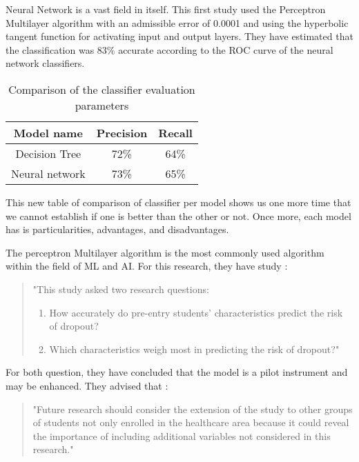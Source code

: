 \documentclass[conference]{IEEEtran}
\begin{document}
Neural Network is a vast field in itself. This first study used the Perceptron Multilayer algorithm with an admissible error of 0.0001 and using the hyperbolic tangent function for activating input and output layers\cite{viloria_integration_2019}. They have estimated that the classification was 83\% accurate according to the ROC curve of the neural network classifiers.
\begin{table}[H]
    \centering
    \caption{Comparison of the classifier evaluation parameters\cite{viloria_integration_2019}}
    \begin{tabular}{|c|c|c|}
        \hline
        \textbf{Model name} & \textbf{Precision}  & \textbf{Recall}\\
        \hline
        Decision Tree & 72\% & 64\% \\
        \hline
        Neural network & 73\% & 65\% \\
        \hline
    \end{tabular}
    \label{tab:comparaison_classifier_eval_param_viloria}
\end{table}

This new table of comparison of classifier per model shows us one more time that we cannot establish if one is better than the other or not. Once more, each model has is particularities, advantages, and disadvantages. 

The perceptron Multilayer algorithm is the most commonly used algorithm within the field of ML and AI.\cite{siri_predicting_2015} For this research, they have study :
\begin{quote}
    "This study asked two research questions: 
    \begin{enumerate}
        \item How accurately do pre-entry students’ characteristics predict the risk of dropout?
        \item Which characteristics weigh most in predicting the risk of dropout?"
    \end{enumerate} 
\end{quote}\cite{siri_predicting_2015}
For both question, they have concluded that the model is a pilot instrument and may be enhanced. They advised that :
\begin{quote}
    "Future research should consider the extension of the study to other groups of students not only enrolled in the healthcare area because it could reveal the importance of including additional variables not considered in this research."
\end{quote}\cite{siri_predicting_2015}
\end{document}
